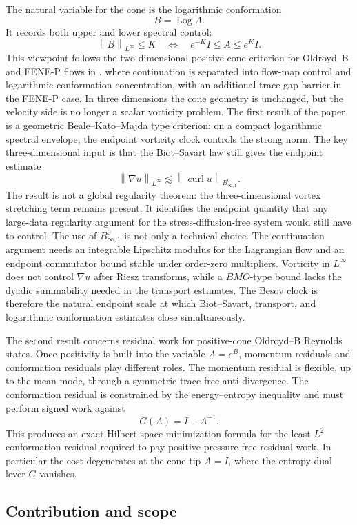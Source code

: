 \documentclass[11pt]{article}
\numberwithin{equation}{section}
\newcommand{\Id}{I}
\newcommand{\curl}{\operatorname{curl}}
\newcommand{\Log}{\operatorname{Log}}
\newcommand{\norm}[1]{\left\lVert #1\right\rVert}
\begin{document}
The natural variable for the cone is the logarithmic conformation
\[
  B=\Log A .
\]
It records both upper and lower spectral control:
\[
  \norm{B}_{L^\infty}\le K
  \quad\Longleftrightarrow\quad
  e^{-K}\Id\le A\le e^K\Id .
\]
This viewpoint follows the two-dimensional positive-cone criterion for
Oldroyd--B and FENE-P flows in \cite{PengUnified}, where continuation is
separated into flow-map control and logarithmic conformation concentration,
with an additional trace-gap barrier in the FENE-P case.  In three dimensions
the cone geometry is unchanged, but the velocity side is no longer a scalar
vorticity problem.  The first result of the paper is a geometric
Beale--Kato--Majda type criterion: on a compact logarithmic spectral envelope,
the endpoint vorticity clock controls the strong norm.  The key
three-dimensional input is that the Biot--Savart law still gives the endpoint
estimate
\[
  \norm{\nabla u}_{L^\infty}\lesssim
  \norm{\curl u}_{B^0_{\infty,1}} .
\]
The result is not a global regularity theorem: the three-dimensional vortex
stretching term remains present.  It identifies the endpoint quantity that any
large-data regularity argument for the stress-diffusion-free system would still
have to control.  The use of \(B^0_{\infty,1}\) is not only a technical choice.
The continuation argument needs an integrable Lipschitz modulus for
the Lagrangian flow and an endpoint commutator bound stable under order-zero
multipliers.  Vorticity in \(L^\infty\) does not control \(\nabla u\) after
Riesz transforms, while a \(BMO\)-type bound lacks the dyadic summability needed
in the transport estimates.  The Besov clock is therefore the natural endpoint
scale at which Biot--Savart, transport, and logarithmic conformation estimates
close simultaneously.

The second result concerns residual work for positive-cone Oldroyd--B Reynolds
states.  Once positivity is built into the variable \(A=e^B\), momentum
residuals and conformation residuals play different roles.  The momentum
residual is flexible, up to the mean mode, through a symmetric trace-free
anti-divergence.  The conformation residual is constrained by the
energy--entropy inequality and must perform signed work against
\[
  G(A)=\Id-A^{-1}.
\]
This produces an exact Hilbert-space minimization formula for the least
\(L^2\) conformation residual required to pay positive pressure-free residual
work.  In particular the cost degenerates at the cone tip \(A=\Id\), where the
entropy-dual lever \(G\) vanishes.

\subsection*{Contribution and scope}
\end{document}
